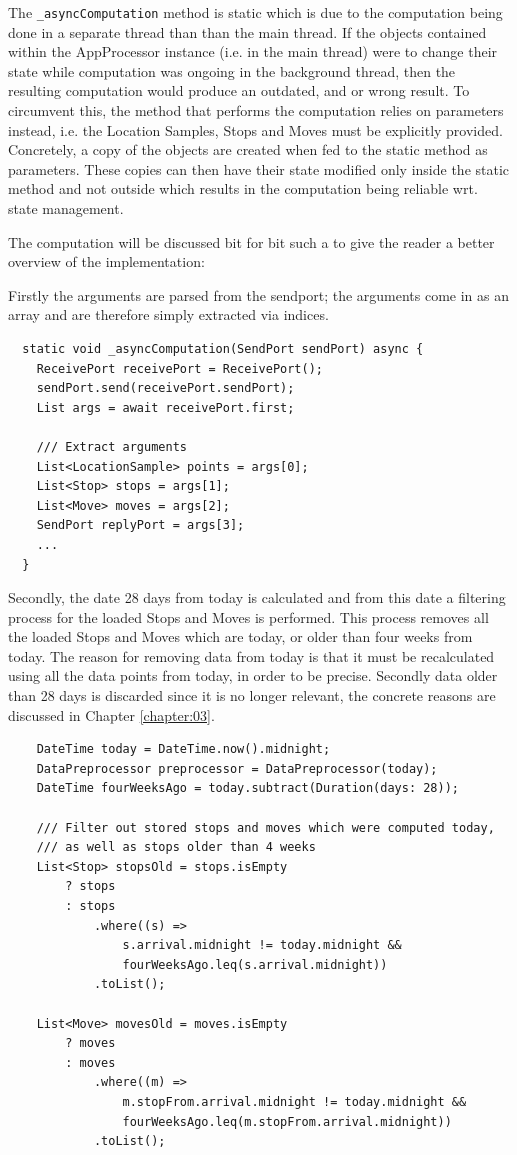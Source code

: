 The \verb|_asyncComputation| method is static which is due to the computation being done in a separate thread than than the main thread. If the objects contained within the AppProcessor instance (i.e. in the main thread) were to change their state while computation was ongoing in the background thread, then the resulting computation would produce an outdated, and or wrong result. To circumvent this, the method that performs the computation relies on parameters instead, i.e. the Location Samples, Stops and Moves must be explicitly provided. Concretely, a copy of the objects are created when fed to the static method as parameters. These copies can then have their state modified only inside the static method and not outside which results in the computation being reliable wrt. state management. 

The computation will be discussed bit for bit such a to give the reader a better overview of the implementation:

Firstly the arguments are parsed from the sendport; the arguments come in as an array and are therefore simply extracted via indices.
\begin{verbatim}
  static void _asyncComputation(SendPort sendPort) async {
    ReceivePort receivePort = ReceivePort();
    sendPort.send(receivePort.sendPort);
    List args = await receivePort.first;

    /// Extract arguments
    List<LocationSample> points = args[0];
    List<Stop> stops = args[1];
    List<Move> moves = args[2];
    SendPort replyPort = args[3];
    ...
  }
\end{verbatim}

Secondly, the date 28 days from today is calculated and from this date a filtering process for the loaded Stops and Moves is performed. This process removes all the loaded Stops and Moves which are today, or older than four weeks from today. The reason for removing data from today is that it must be recalculated using all the data points from today, in order to be precise. Secondly data older than 28 days is discarded since it is no longer relevant, the concrete reasons are discussed in Chapter \ref{chapter:03}.
\begin{verbatim}
    DateTime today = DateTime.now().midnight;
    DataPreprocessor preprocessor = DataPreprocessor(today);
    DateTime fourWeeksAgo = today.subtract(Duration(days: 28));

    /// Filter out stored stops and moves which were computed today,
    /// as well as stops older than 4 weeks
    List<Stop> stopsOld = stops.isEmpty
        ? stops
        : stops
            .where((s) =>
                s.arrival.midnight != today.midnight &&
                fourWeeksAgo.leq(s.arrival.midnight))
            .toList();

    List<Move> movesOld = moves.isEmpty
        ? moves
        : moves
            .where((m) =>
                m.stopFrom.arrival.midnight != today.midnight &&
                fourWeeksAgo.leq(m.stopFrom.arrival.midnight))
            .toList();
\end{verbatim}

